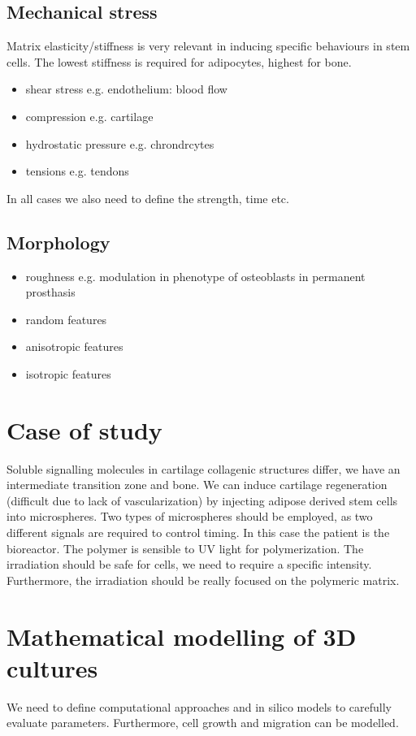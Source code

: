 \subsection{Mechanical stress}
Matrix elasticity/stiffness is very relevant in inducing specific behaviours in stem cells. 
The lowest stiffness is required for adipocytes, highest for bone. 
\begin{itemize}
\item shear stress e.g. endothelium: blood flow
\item compression e.g. cartilage
\item hydrostatic pressure e.g. chrondrcytes
\item tensions e.g. tendons
\end{itemize}
In all cases we also need to define the strength, time etc.

\subsection{Morphology}
\begin{itemize}
\item roughness e.g. modulation in phenotype of osteoblasts in permanent prosthasis
\item random features
\item anisotropic features
\item isotropic features
\end{itemize}

\section{Case of study}
Soluble signalling molecules in cartilage collagenic structures differ,  we have  an intermediate transition zone and bone. 
We can induce cartilage regeneration (difficult due to lack of vascularization) by injecting adipose derived stem cells into microspheres. Two types of microspheres should be employed,  as two different signals are required to control timing. 
In this case the patient is the bioreactor.
The polymer is sensible to UV light for polymerization. 
The irradiation should be safe for cells, we need to require a specific intensity. 
Furthermore, the irradiation should be really focused on the polymeric matrix. 

\section{Mathematical modelling of 3D cultures}
We need to define computational approaches and in silico models to carefully evaluate parameters. Furthermore, cell growth and migration can be modelled.

